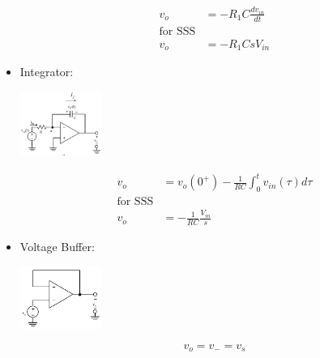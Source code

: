 \documentclass[nobib]{tufte-handout}
\begin{document}
\begin{itemize}
\begin{center}
          \end{center}
          \begin{align*}
              v_o & = -R_1C\frac{dv_{in}}{dt} \\
              \text{for SSS}                  \\
              v_o & = -R_1CsV_{in}
          \end{align*}
    \item Integrator:
          \begin{center}
              \includegraphics[width = 100px]{images/integrator.png}
          \end{center}
          \begin{align*}
              v_o & = v_o(0^+)-\frac{1}{RC}\int_{0}^{t}v_{in}(\tau) d\tau \\
              \text{for SSS}                                              \\
              v_o & = -\frac{1}{RC}\frac{V_{in}}{s}
          \end{align*}
    \item Voltage Buffer:
          \begin{center}
              \includegraphics[width = 100px]{images/v_buffer_opamp.png}
          \end{center}
          \begin{equation*}
              v_o = v_- = v_s
          \end{equation*}
\end{itemize}
\end{document}

